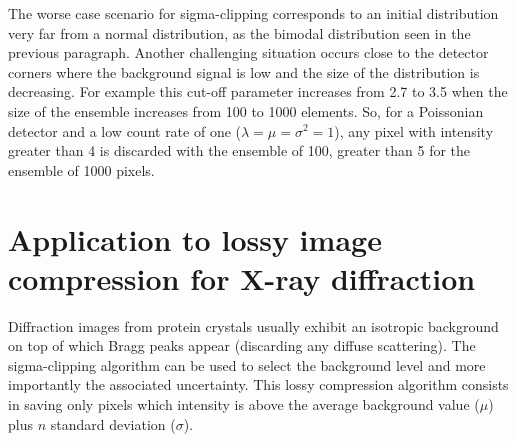 \documentclass[preprint]{iucr}              %
\begin{document}
The worse case scenario for sigma-clipping corresponds to an initial distribution very far from a normal distribution, as the bimodal distribution seen in the previous paragraph.
Another challenging situation occurs close to the detector corners where the background signal is low and the size of the distribution is decreasing. 
For example this cut-off parameter increases from 2.7 to 3.5 when the size of the ensemble increases from 100 to 1000 elements.
So, for a Poissonian detector and a low count rate of one ($\lambda = \mu = \sigma^2 = 1$), any pixel with intensity greater than 4 is discarded with the ensemble of 100,  greater than 5 for the ensemble of 1000 pixels.

\section{Application to lossy image compression for X-ray diffraction}
Diffraction images from protein crystals usually exhibit an isotropic background on top of which Bragg peaks appear (discarding any diffuse scattering). 
The sigma-clipping algorithm can be used to select the background level and more importantly the associated uncertainty.
This lossy compression algorithm consists in saving only pixels which intensity is above the average background value ($\mu$) plus $n$ standard deviation ($\sigma$). 
\end{document}
